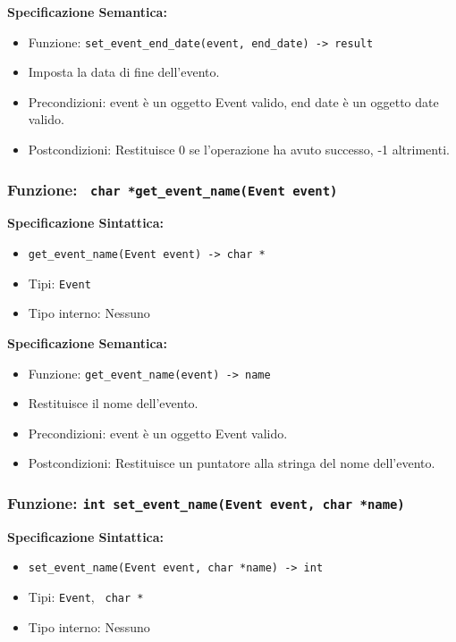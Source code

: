 \documentclass[11pt]{scrartcl} %
\begin{document}
\textbf{Specificazione Semantica:}
\begin{itemize}
\item Funzione: \texttt{set\_event\_end\_date(event, end\_date) -> result}
\item Imposta la data di fine dell'evento.
\item Precondizioni: event è un oggetto Event valido, end date è un oggetto date valido.
\item Postcondizioni: Restituisce 0 se l'operazione ha avuto successo, -1 altrimenti.
\end{itemize}

\subsubsection{Funzione: \texttt{ char *get\_event\_name(Event event)}}

\textbf{Specificazione Sintattica:}
\begin{itemize}
\item \texttt{get\_event\_name(Event event) ->  char *}
\item Tipi: \texttt{Event}
\item Tipo interno: Nessuno
\end{itemize}

\textbf{Specificazione Semantica:}
\begin{itemize}
\item Funzione: \texttt{get\_event\_name(event) -> name}
\item Restituisce il nome dell'evento.
\item Precondizioni: event è un oggetto Event valido.
\item Postcondizioni: Restituisce un puntatore alla stringa del nome dell'evento.
\end{itemize}

\subsubsection{Funzione: \texttt{int set\_event\_name(Event event,  char *name)}}

\textbf{Specificazione Sintattica:}
\begin{itemize}
\item \texttt{set\_event\_name(Event event,  char *name) -> int}
\item Tipi: \texttt{Event}, \texttt{ char *}
\item Tipo interno: Nessuno
\end{itemize}
\end{document}
